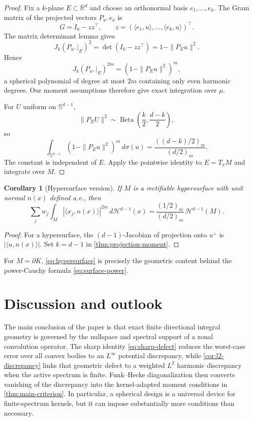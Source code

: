 \documentclass[12pt,a4paper]{article}
\newcommand{\Sph}{\mathbb S}
\newcommand{\R}{\mathbb R}
\theoremstyle{plain}
\newtheorem{corollary}[theorem]{Corollary}
\theoremstyle{definition}
\begin{document}
\begin{proof}
Fix a $k$-plane $E\subset\R^d$ and choose an orthonormal basis $e_1,\ldots,e_k$.  The Gram matrix of the projected vectors $P_{u^\perp}e_a$ is
\[
 G=I_k-zz^\top,
 \qquad
 z=(\langle e_1,u\rangle,\ldots,\langle e_k,u\rangle)^\top.
\]
The matrix determinant lemma gives
\[
 J_k(P_{u^\perp}|_E)^2
 =\det(I_k-zz^\top)
 =1-\|P_Eu\|^2.
\]
Hence
\[
 J_k(P_{u^\perp}|_E)^{2m}
 =(1-\|P_Eu\|^2)^m,
\]
a spherical polynomial of degree at most $2m$ containing only even harmonic degrees.  Our moment assumptions therefore give exact integration over $\mu$.

For $U$ uniform on $\Sph^{d-1}$,
\[
 \|P_EU\|^2\sim\operatorname{Beta}\!\left(\frac k2,\frac{d-k}{2}\right),
\]
so
\[
 \int_{\Sph^{d-1}}(1-\|P_Eu\|^2)^m\,d\sigma(u)
 =\frac{((d-k)/2)_m}{(d/2)_m}.
\]
The constant is independent of $E$.  Apply the pointwise identity to $E=T_xM$ and integrate over $M$.
\end{proof}

\begin{corollary}[Hypersurface version]\label{cor:hypersurface}
If $M$ is a rectifiable hypersurface with unit normal $n(x)$ defined a.e., then
\begin{equation}\label{eq:hypersurface}
 \sum_jw_j\int_M|\langle x_j,n(x)\rangle|^{2m}\,d\mathcal H^{d-1}(x)
 =\frac{(1/2)_m}{(d/2)_m}\,\mathcal H^{d-1}(M).
\end{equation}
\end{corollary}

\begin{proof}
For a hypersurface, the $(d-1)$-Jacobian of projection onto $u^\perp$ is $|\langle u,n(x)\rangle|$.  Set $k=d-1$ in \cref{thm:projection-moment}.
\end{proof}

For $M=\partial K$, \eqref{eq:hypersurface} is precisely the geometric content behind the power-Cauchy formula \eqref{eq:surface-power}.

\section{Discussion and outlook}

The main conclusion of the paper is that exact finite directional integral geometry is governed by the nullspace and spectral support of a zonal convolution operator. The sharp identity \eqref{eq:sharp-defect} reduces the worst-case error over all convex bodies to an $L^\infty$ potential discrepancy, while \cref{cor:l2-discrepancy} links that geometric defect to a weighted $L^2$ harmonic discrepancy when the active spectrum is finite. Funk--Hecke diagonalization then converts vanishing of the discrepancy into the kernel-adapted moment conditions in \cref{thm:main-criterion}. In particular, a spherical design is a universal device for finite-spectrum kernels, but it can impose substantially more conditions than necessary.
\end{document}
